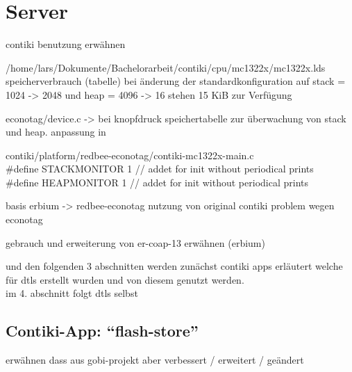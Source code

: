 \section{Server}

contiki benutzung erwähnen

/home/lars/Dokumente/Bachelorarbeit/contiki/cpu/mc1322x/mc1322x.lds\\
speicherverbrauch (tabelle) bei änderung der standardkonfiguration auf stack = 1024 -> 2048 und heap = 4096 -> 16 stehen 15 KiB zur Verfügung

econotag/device.c  -> bei knopfdruck speichertabelle zur überwachung von stack und heap. anpassung in 


contiki/platform/redbee-econotag/contiki-mc1322x-main.c\\
\#define STACKMONITOR 1 // addet for init without periodical prints\\
\#define HEAPMONITOR 1  // addet for init without periodical prints


basis erbium -> redbee-econotag nutzung von original contiki problem wegen econotag

gebrauch und erweiterung von er-coap-13 erwähnen (erbium)

und den folgenden 3 abschnitten werden zunächst contiki apps erläutert welche für dtls erstellt wurden und von diesem genutzt werden.\\
im 4. abschnitt folgt dtls selbst 

\subsection{Contiki-App: "`flash-store"'}
erwähnen dass aus gobi-projekt aber verbessert / erweitert / geändert

